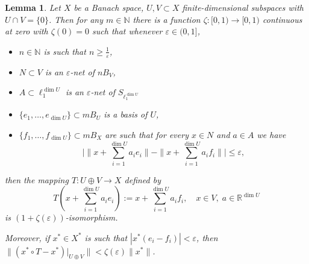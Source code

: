 \documentclass[10pt,a4paper]{amsart}
\newtheorem{lemma}{Lemma}
\newcommand{\Nat}{\mathbb N}
\newcommand{\Rea}{\mathbb R}
\begin{document}
\begin{lemma}\label{lem:calculations}
Let $X$ be a Banach space, $U,V\subset X$ finite-dimensional subspaces with $U\cap V = \{0\}$. Then for any $m\in\Nat$ there is a function $\zeta:[0,1)\to[0,1)$ continuous at zero with $\zeta(0)=0$ such that whenever $\varepsilon\in (0,1]$,
\begin{itemize}
    \item $n\in\Nat$ is such that $n\geq \tfrac{1}{\varepsilon}$,
    \item $N\subset V$ is an $\varepsilon$-net of $nB_V$,
    \item $A\subset \ell_1^{\dim U}$ is an $\varepsilon$-net of $S_{\ell_1^{\dim U}}$
    \item $\{e_1,\ldots,e_{\dim U}\}\subset mB_U$ is a basis of $U$,
    \item $\{f_1,\ldots,f_{\dim U}\}\subset mB_X$ are such that for every $x\in N$ and $a\in A$ we have
        \[
            \Big|\|x+\sum_{i=1}^{\dim U}a_i e_i\| - \|x+\sum_{i=1}^{\dim U}a_i f_i\|\Big| \leq \varepsilon,
        \]
\end{itemize}
then the mapping $T:U\oplus V\to X$ defined by 
\[
T(x+\sum_{i=1}^{\dim U}a_i e_i):=x+\sum_{i=1}^{\dim U}a_i f_i,\quad x\in V,\; a\in \Rea^{\dim U}
\]
is $(1+\zeta(\varepsilon))$-isomorphism.

Moreover, if $x^*\in X^*$ is such that $|x^*(e_i-f_i)|<\varepsilon$, then $\|(x^*\circ T - x^*)|_{U\oplus V}\| < \zeta(\varepsilon)\|x^*\|$.
\end{lemma}
\end{document}
